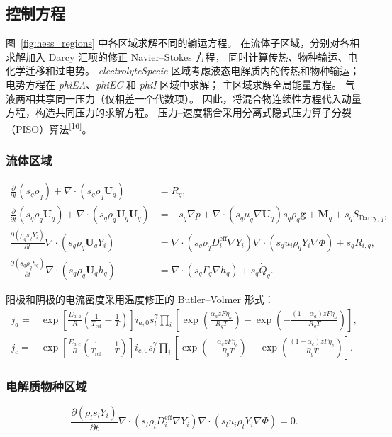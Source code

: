 \documentclass[UTF8,zihao=-4,fontset=fandol]{ctexart}
\newcommand{\vect}[1]{\bm{#1}}
\begin{document}
\subsection{控制方程}

图~\ref{fig:hess_regions} 中各区域求解不同的输运方程。
在流体子区域，分别对各相求解加入 Darcy 汇项的修正 Navier--Stokes 方程，
同时计算传热、物种输运、电化学迁移和过电势。
\emph{electrolyteSpecie} 区域考虑液态电解质内的传热和物种输运；
电势方程在 \emph{phiEA}、\emph{phiEC} 和 \emph{phiI} 区域中求解；
主区域求解全局能量方程。
气液两相共享同一压力（仅相差一个代数项）。
因此，将混合物连续性方程代入动量方程，构造共同压力的求解方程。
压力--速度耦合采用分离式隐式压力算子分裂（PISO）算法\textsuperscript{[16]}。

\subsubsection{流体区域}
\begin{align}
\frac{\partial}{\partial t}(s_q\rho_q)+
\nabla\cdot(s_q\rho_q\vect{U}_q)&=R_q, \tag{1}\\
\frac{\partial}{\partial t}(s_q\rho_q\vect{U}_q)+
\nabla\cdot(s_q\rho_q\vect{U}_q\vect{U}_q)
&=-s_q\nabla p+\nabla\cdot(s_q\mu_q\nabla\vect{U}_q)
s_q\rho_q\vect{g}+\vect{M}_q+s_qS_{\mathrm{Darcy},q}, \tag{2}\\
\frac{\partial(\rho_qs_qY_i)}{\partial t}
\nabla\cdot(s_q\rho_q\vect{U}_qY_i)
&=\nabla\cdot(s_q\rho_qD_i^{\mathrm{eff}}\nabla Y_i)
\nabla\cdot(s_qu_i\rho_qY_i\nabla\Phi)+s_qR_{i,q}, \tag{3}\\
\frac{\partial(s_q\rho_qh_q)}{\partial t}
\nabla\cdot(s_q\rho_q\vect{U}_qh_q)
&=\nabla\cdot(s_q\Gamma_q\nabla h_q)+s_q\dot Q_q. \tag{4}
\end{align}

阳极和阴极的电流密度采用温度修正的 Butler--Volmer 形式：
\begin{align}
j_a={}&\exp\!\left[\frac{E_{a,a}}{R}\left(\frac{1}{T_{\mathrm{ref}}}-\frac{1}{T}\right)\right]
i_{a,0}s_l^\gamma\prod_i
\left[
\exp\!\left(\frac{\alpha_a zF\eta_a}{R_gT}\right)
-\exp\!\left(-\frac{(1-\alpha_a)zF\eta_a}{R_gT}\right)
\right], \tag{5}\\
j_c={}&\exp\!\left[\frac{E_{a,c}}{R}\left(\frac{1}{T_{\mathrm{ref}}}-\frac{1}{T}\right)\right]
i_{c,0}s_l^\gamma\prod_i
\left[
\exp\!\left(-\frac{\alpha_c zF\eta_c}{R_gT}\right)
-\exp\!\left(\frac{(1-\alpha_c)zF\eta_c}{R_gT}\right)
\right]. \tag{6}
\end{align}

\subsubsection{电解质物种区域}
\begin{equation}
\frac{\partial(\rho_ls_lY_i)}{\partial t}
\nabla\cdot(s_l\rho_lD_i^{\mathrm{eff}}\nabla Y_i)
\nabla\cdot(s_lu_i\rho_lY_i\nabla\Phi)=0. \tag{7}
\end{equation}
\end{document}
